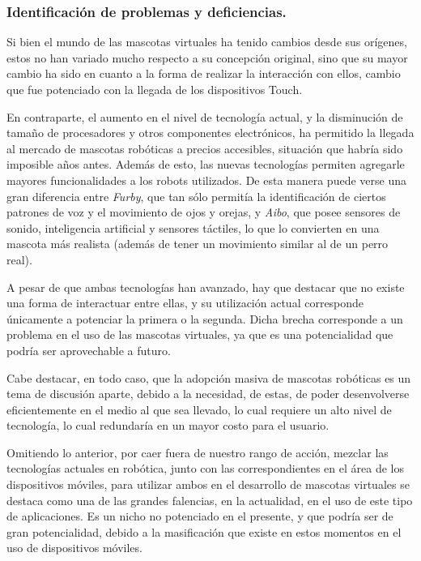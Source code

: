 \subsubsection{Identificaci\'on de problemas y deficiencias.}

Si bien el mundo de las mascotas virtuales ha tenido cambios desde sus or\'igenes, estos no han variado mucho respecto a su concepci\'on original, sino que su mayor cambio ha sido en cuanto a la forma de realizar la interacci\'on con ellos, cambio que fue potenciado con la llegada de los dispositivos Touch.

En contraparte, el aumento en el nivel de tecnolog\'ia actual, y la disminuci\'on de tama\~no de procesadores y otros componentes electr\'onicos, ha permitido la llegada al mercado de mascotas rob\'oticas a precios accesibles, situaci\'on que habr\'ia sido imposible a\~nos antes. Adem\'as de esto, las nuevas tecnolog\'ias permiten agregarle mayores funcionalidades a los robots utilizados. De esta manera puede verse una gran diferencia entre \emph{Furby}, que tan s\'olo permit\'ia la identificaci\'on de ciertos patrones de voz y el movimiento de ojos y orejas, y \emph{Aibo}, que posee sensores de sonido, inteligencia artificial y sensores t\'actiles, lo que lo convierten en una mascota m\'as realista (adem\'as de tener un movimiento similar al de un perro real).

A pesar de que ambas tecnolog\'ias han avanzado, hay que destacar que no existe una forma de interactuar entre ellas, y su utilizaci\'on actual corresponde \'unicamente a potenciar la primera o la segunda. Dicha brecha corresponde a un problema en el uso de las mascotas virtuales, ya que es una potencialidad que podr\'ia ser aprovechable a futuro.

Cabe destacar, en todo caso, que la adopci\'on masiva de mascotas rob\'oticas es un tema de discusi\'on aparte, debido a la necesidad, de estas, de poder desenvolverse eficientemente en el medio al que sea llevado, lo cual requiere un alto nivel de tecnolog\'ia, lo cual redundar\'ia en un mayor costo para el usuario.

Omitiendo lo anterior, por caer fuera de nuestro rango de acci\'on, mezclar las tecnolog\'ias actuales en rob\'otica, junto con las correspondientes en el \'area de los dispositivos m\'oviles, para utilizar ambos en el desarrollo de mascotas virtuales se destaca como una de las grandes falencias, en la actualidad, en el uso de este tipo de aplicaciones. Es un nicho no potenciado en el presente, y que podr\'ia ser de gran potencialidad, debido a la masificaci\'on que existe en estos momentos en el uso de dispositivos m\'oviles.

